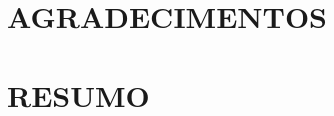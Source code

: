 






%         

    \center \fontsize{12}{14} \selectfont \section*{AGRADECIMENTOS}
    \justifying
    \hspace{1.5cm} 
    \pagebreak

    

    \justifying
    \section*{\fontsize{12}{14} \selectfont RESUMO}
    

